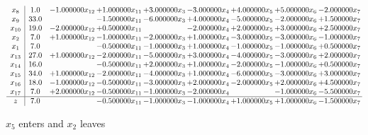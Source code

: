 \documentclass[10pt]{article}
\begin{document}
 \[\begin{array}{c| c c@{\hskip 2pt} c@{\hskip 2pt} c@{\hskip 2pt} c@{\hskip 2pt} c@{\hskip 2pt} c@{\hskip 2pt} c@{\hskip 2pt} }
 x_{8}   &  1.0 & -1.000000 x_{12} & + 1.000000 x_{11} & + 3.000000 x_{3} & -3.000000 x_{4} & + 4.000000 x_{5} & + 5.000000 x_{6} & -2.000000 x_{7}\\
 x_{9}   &  33.0  &   & -1.500000 x_{11} & -6.000000 x_{3} & + 4.000000 x_{4} & -5.000000 x_{5} & -2.000000 x_{6} & + 1.500000 x_{7}\\
 x_{10}   &  19.0 & -2.000000 x_{12} & + 0.500000 x_{11} &   & -2.000000 x_{4} & + 2.000000 x_{5} & + 3.000000 x_{6} & + 2.500000 x_{7}\\
 x_{2}   &  7.0 & + 1.000000 x_{12} & -1.000000 x_{11} & -2.000000 x_{3} & + 1.000000 x_{4} & -3.000000 x_{5} & -3.000000 x_{6} & -1.000000 x_{7}\\
 x_{1}   &  7.0  &   & -0.500000 x_{11} & -1.000000 x_{3} & + 1.000000 x_{4} & -1.000000 x_{5} & -1.000000 x_{6} & + 0.500000 x_{7}\\
 x_{13}   &  27.0 & + 1.000000 x_{12} & -2.000000 x_{11} & -5.000000 x_{3} & + 3.000000 x_{4} & -4.000000 x_{5} & -3.000000 x_{6} & + 2.000000 x_{7}\\
 x_{14}   &  16.0  &   & -0.500000 x_{11} & + 2.000000 x_{3} & + 1.000000 x_{4} & -2.000000 x_{5} & -1.000000 x_{6} & + 0.500000 x_{7}\\
 x_{15}   &  34.0 & + 1.000000 x_{12} & -2.000000 x_{11} & -4.000000 x_{3} & + 1.000000 x_{4} & -6.000000 x_{5} & -3.000000 x_{6} & + 3.000000 x_{7}\\
 x_{16}   &  18.0 & -1.000000 x_{12} & -0.500000 x_{11} & -3.000000 x_{3} & + 2.000000 x_{4} & -2.000000 x_{5} & + 2.000000 x_{6} & + 4.500000 x_{7}\\
 x_{17}   &  7.0 & + 2.000000 x_{12} & -0.500000 x_{11} & -1.000000 x_{3} & -2.000000 x_{4} &   & -1.000000 x_{6} & -5.500000 x_{7}\\
\hline
z    &  7.0  &   & -0.500000 x_{11} & -1.000000 x_{3} & -1.000000 x_{4} & + 1.000000 x_{5} & + 1.000000 x_{6} & -1.500000 x_{7}\\
\end{array}\]


 $ x_{5} $ enters and $ x_{2} $ leaves 
\end{document}
